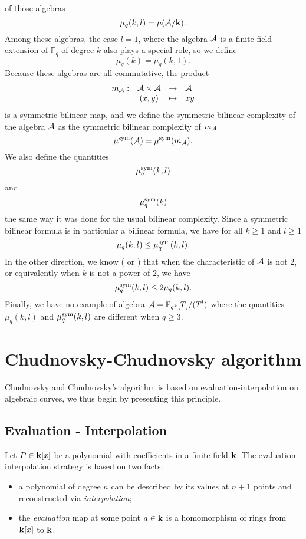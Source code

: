of those algebras
\[
  \mu_q(k, l) = \mu(\mathcal{A}/\mathbf{k}).
\]
Among these algebras, the case $l=1$, where the algebra $\mathcal{A}$ is a finite field
extension of $\mathbb{F}_q$ of degree $k$ also plays a special role, so we
define 
\[
  \mu_q(k) = \mu_q(k, 1).
\]
Because these algebras are all commutative, the product 
\[
\begin{array}{lccl}
  m_{\mathcal{A}}:&\mathcal{A}\times \mathcal{A}&\to&\mathcal{A}\\
  &(x, y)&\mapsto&xy
\end{array}
\]
is a symmetric bilinear map, and we define the symmetric bilinear complexity of
the algebra $\mathcal{A}$ as the symmetric bilinear complexity of $m_{\mathcal{A}}$
\[
  \mu^{\textrm{sym}}(\mathcal{A}) = \mu^{\textrm{sym}}(m_{\mathcal{A}}).
\]
We also define the quantities
\[
  \mu^{\textrm{sym}}_q(k, l)
\]
and 
\[
  \mu^{\textrm{sym}}_q(k)
\]
the same way it was done for the usual bilinear complexity. Since a symmetric
bilinear formula is in particular a bilinear formula, we have for all $k\geq1$
and $l\geq1$
\[
  \mu_q(k, l)\leq\mu^{\textrm{sym}}_q(k, l).
\]
In the other direction, we know (\cite[Theorem $1$]{SL84} or \cite[Lemma
$1.6$]{Randriam12}) that when the characteristic of $\mathcal{A}$ is not $2$,
or equivalently when $k$ is not a power of $2$, we have
\[
  \mu^{\textrm{sym}}_q(k, l)\leq2\mu_q(k, l).
\]
Finally, we have no example of algebra $\mathcal{A} = \mathbb{F}_{q^k}[T]/(T^l)$ where the
quantities $\mu_q(k, l)$ and $\mu^{\textrm{sym}}_q(k, l)$ are different when $q\geq3$.
%

\section{Chudnovsky-Chudnovsky algorithm}

Chudnovsky and Chudnovsky's algorithm is based on evaluation-interpolation on
algebraic curves, we thus begin by presenting this principle.
\subsection{Evaluation - Interpolation}
\label{sec:evalinter}

Let $P\in\mathbf{k}[x]$ be a polynomial with coefficients in a finite field $\mathbf{k}$. The
evaluation-interpolation strategy is based on two facts:
\begin{itemize}
  \item a polynomial of degree $n$ can be described by its values at $n+1$
    points and reconstructed via \emph{interpolation};
  \item the \emph{evaluation} map at some point $a\in\mathbf{k}$ is a homomorphism of rings from
    $\mathbf{k}[x]$ to $\mathbf{k}$.
\end{itemize}
